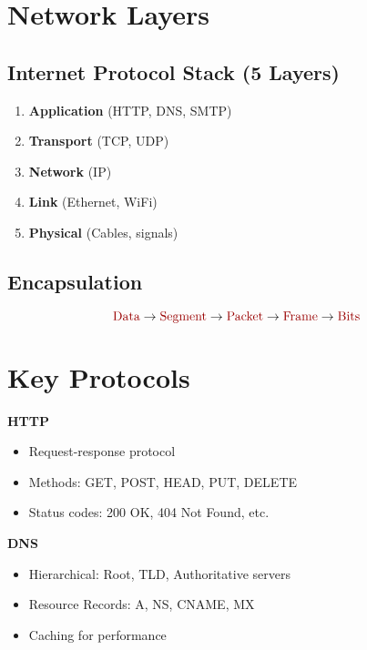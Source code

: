 \documentclass[9pt]{extarticle}
\begin{document}
\small
\begin{multicols*}{3}
{\color{sectioncolor}\section*{\centering Network Layers}}
{\color{subsectioncolor}\subsection*{Internet Protocol Stack (5 Layers)}}
\begin{enumerate}
\item \textbf{Application} (HTTP, DNS, SMTP)
\item \textbf{Transport} (TCP, UDP)
\item \textbf{Network} (IP)
\item \textbf{Link} (Ethernet, WiFi)
\item \textbf{Physical} (Cables, signals)
\end{enumerate}
{\color{subsectioncolor}\subsection*{Encapsulation}}
\[
\text{\color{highlight}{Data}} \rightarrow \text{\color{highlight}{Segment}} \rightarrow \text{\color{highlight}{Packet}} \rightarrow \text{\color{highlight}{Frame}} \rightarrow \text{\color{highlight}{Bits}}
\]
{\color{sectioncolor}\section*{\centering Key Protocols}}
\textbf{HTTP}
\begin{itemize}
\item Request-response protocol
\item Methods: GET, POST, HEAD, PUT, DELETE
\item Status codes: 200 OK, 404 Not Found, etc.
\end{itemize}
\textbf{DNS}
\begin{itemize}
\item Hierarchical: Root, TLD, Authoritative servers
\item Resource Records: A, NS, CNAME, MX
\item Caching for performance

\end{itemize}
\end{multicols*}
\end{document}
